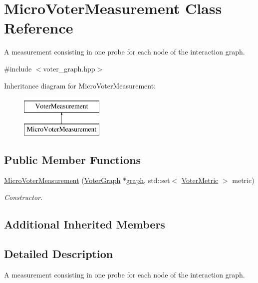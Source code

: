\hypertarget{class_micro_voter_measurement}{}\section{Micro\+Voter\+Measurement Class Reference}
\label{class_micro_voter_measurement}


A measurement consisting in one probe for each node of the interaction graph.  




{\ttfamily \#include $<$voter\+\_\+graph.\+hpp$>$}

Inheritance diagram for Micro\+Voter\+Measurement\+:\begin{figure}[H]
\begin{center}
\leavevmode
\includegraphics[height=2.000000cm]{class_micro_voter_measurement}
\end{center}
\end{figure}
\subsection*{Public Member Functions}
\begin{DoxyCompactItemize}
\item 
\hyperlink{class_micro_voter_measurement_a5ab772e26666d7ddf100a0cfea95afee}{Micro\+Voter\+Measurement} (\hyperlink{class_voter_graph}{Voter\+Graph} $\ast$\hyperlink{class_voter_measurement_a8d22d4b78f7e2f4c747f5716c4885351}{graph}, std\+::set$<$ \hyperlink{voter__graph_8hpp_acb4c45a5ce4a55eee28e54e60409b9c5}{Voter\+Metric} $>$ metric)
\begin{DoxyCompactList}\small\item\em Constructor. \end{DoxyCompactList}\end{DoxyCompactItemize}
\subsection*{Additional Inherited Members}


\subsection{Detailed Description}
A measurement consisting in one probe for each node of the interaction graph. 


